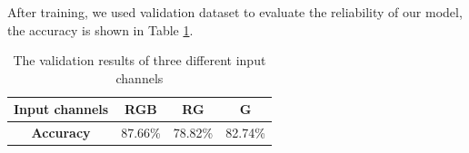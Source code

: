 \documentclass[12pt]{article}
\begin{document}
\par After training, we used validation dataset to evaluate the reliability of our model, the accuracy is shown in Table \ref{accuracy_table}.
\begin{table}[!htbp]
\renewcommand{\arraystretch}{1.2}
\centering
\caption{The validation results of three different input channels}
\begin{tabular}{|c|c|c|c|}
\hline
{\color[HTML]{000000} \textbf{Input channels}} & {\color[HTML]{000000} RGB}     & {\color[HTML]{000000} RG}      & {\color[HTML]{000000} G}       \\\hline
{\color[HTML]{000000} \textbf{Accuracy}}       & {\color[HTML]{000000} 87.66\%} & {\color[HTML]{000000} 78.82\%} & {\color[HTML]{000000} 82.74\%}\\ \hline
\end{tabular}
\label{accuracy_table}
\end{table}
\end{document}
